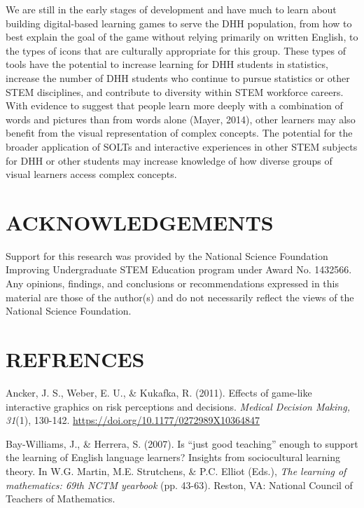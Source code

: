 \documentclass[11.5pt]{sig-alternate} %
\begin{document}
\begin{large}
We are still in the early stages of development and have much to learn about building digital-based learning games to serve the DHH population, from how to best explain the goal of the game without relying primarily on written English, to the types of icons that are culturally appropriate for this group. These types of tools have the potential to increase learning for DHH students in statistics, increase the number of DHH students who continue to pursue statistics or other STEM disciplines, and contribute to diversity within STEM workforce careers. With evidence to suggest that people learn more deeply with a combination of words and pictures than from words alone (Mayer, 2014), other learners may also benefit from the visual representation of complex concepts. The potential for the broader application of SOLTs and interactive experiences in other STEM subjects for DHH or other students may increase knowledge of how diverse groups of visual learners access complex concepts.

\section*{ACKNOWLEDGEMENTS}

Support for this research was provided by the National Science Foundation Improving Undergraduate STEM Education program under Award No. 1432566. Any opinions, findings, and conclusions or recommendations expressed in this material are those of the author(s) and do not necessarily reflect the views of the National Science Foundation.

\end{large}
\clearpage
\section*{REFRENCES}\par 
\leftskip 0.25in
\parindent -0.25in 
Ancker, J. S., Weber, E. U., \& Kukafka, R. (2011). Effects of game-like interactive graphics on risk perceptions and decisions. \textit{Medical Decision Making, 31}(1), 130-142. \url{https://doi.org/10.1177/0272989X10364847} 

Bay-Williams, J., \& Herrera, S. (2007). Is “just good teaching” enough to support the learning of English language learners? Insights from sociocultural learning theory. In W.G. Martin, M.E. Strutchens, \& P.C. Elliot (Eds.), \textit{The learning of mathematics: 69th NCTM yearbook} (pp. 43-63). Reston, VA: National Council of Teachers of Mathematics.
\end{document}
